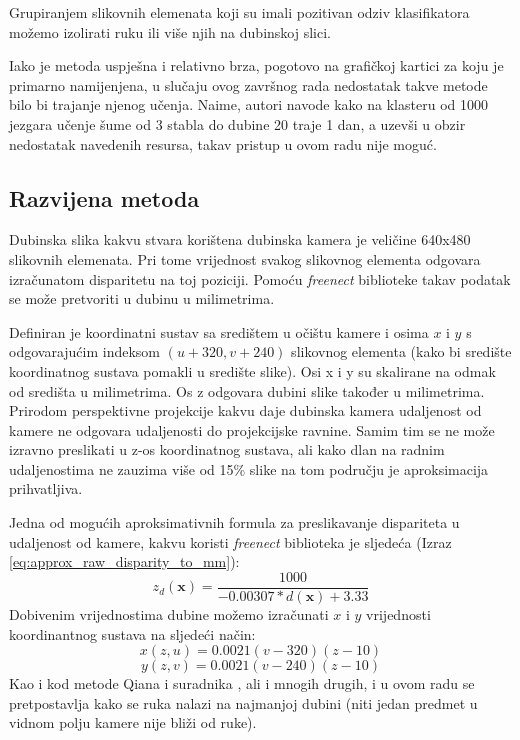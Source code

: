 \documentclass[times, utf8, diplomski, numeric]{fer}
\begin{document}
Grupiranjem slikovnih elemenata koji su imali pozitivan odziv klasifikatora možemo izolirati ruku ili više njih na dubinskoj slici.

Iako je metoda uspješna i relativno brza, pogotovo na grafičkoj kartici za koju je primarno namijenjena, u slučaju ovog završnog rada nedostatak takve metode bilo bi trajanje njenog učenja. Naime, autori navode kako na klasteru od 1000 jezgara učenje šume od 3 stabla do dubine 20 traje 1 dan, a uzevši u obzir nedostatak navedenih resursa, takav pristup u ovom radu nije moguć.

\subsection{Razvijena metoda}

Dubinska slika kakvu stvara korištena dubinska kamera je veličine 640x480 slikovnih elemenata. Pri tome vrijednost svakog slikovnog elementa odgovara izračunatom disparitetu na toj poziciji. Pomoću \textit{freenect} biblioteke takav podatak se može pretvoriti u dubinu u milimetrima.

Definiran je koordinatni sustav sa središtem u očištu kamere i osima $x$ i $y$ s odgovarajućim indeksom $(u+320,v+240)$ slikovnog elementa (kako bi središte koordinatnog sustava pomakli u središte slike). Osi x i y su skalirane na odmak od središta u milimetrima. Os z odgovara dubini slike također u milimetrima. Prirodom perspektivne projekcije kakvu daje dubinska kamera udaljenost od kamere ne odgovara udaljenosti do projekcijske ravnine. Samim tim se ne može izravno preslikati u z-os koordinatnog sustava, ali kako dlan na radnim udaljenostima ne zauzima više od 15\% slike na tom području je aproksimacija prihvatljiva.

Jedna od mogućih aproksimativnih formula za preslikavanje dispariteta u udaljenost od kamere, kakvu koristi \textit{freenect} biblioteka \cite{openkinect} je sljedeća (Izraz \ref{eq:approx_raw_disparity_to_mm}):
\begin{equation}
	\label{eq:approx_raw_disparity_to_mm}
	z_{d}(\mathbf{x})=\frac{1000}{-0.00307*d(\mathbf{x})+3.33}
\end{equation}
Dobivenim vrijednostima dubine možemo izračunati $x$ i $y$ vrijednosti koordinantnog sustava na sljedeći način:
\begin{equation}
	\label{eq:raw_disparity_to_mm_x}
	    x(z,u)=0.0021(v - 320)(z-10) 
\end{equation}
\begin{equation}
	\label{eq:raw_disparity_to_mm_y}
	    y(z,v)=0.0021(v - 240)(z-10)
\end{equation}
Kao i kod metode Qiana i suradnika \cite{qian2014realtime}, ali i mnogih drugih, i u ovom radu se pretpostavlja kako se ruka nalazi na najmanjoj dubini (niti jedan predmet u vidnom polju kamere nije bliži od ruke).
\end{document}
